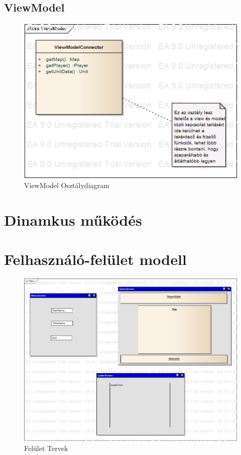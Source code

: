 \documentclass[a4paper,12pt]{report}
\begin{document}
\subsection{ViewModel}

\begin{figure}[hbtp]
\centering
\includegraphics[width=1\textwidth]{ViewModelClass.png}
\caption{ViewModel Osztálydiagram}
\label{fig:vmc}
\end{figure}

\section{Dinamkus működés}

\section{Felhasználó-felület modell}

\begin{figure}[hbtp]
\centering
\includegraphics[width=1\textwidth]{ViewScreen.png}
\caption{Felület Tervek}
\label{fig:vs}
\end{figure}
\end{document}

